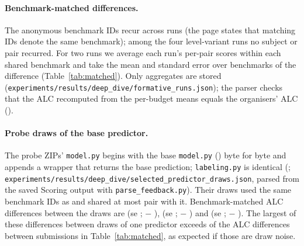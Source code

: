 \documentclass{article}
\begin{document}
\paragraph{Benchmark-matched differences.} The anonymous benchmark IDs recur across runs (the page states that matching IDs denote the same benchmark); among the four level-variant runs no subject or pair recurred. For two runs we average each run's per-pair scores within each shared benchmark and take the mean and standard error over benchmarks of the difference (Table~\ref{tab:matched}). Only aggregates are stored (\texttt{experiments/results/deep\_dive/formative\_runs.json}); the parser checks that the ALC recomputed from the per-budget means equals the organisers' ALC (\FmSelAlcConsistent).

\begin{table}[htbp]
\caption{Benchmark-matched differences between formative runs: mean (standard error) over the \FmMatchSelShipN{} shared benchmarks. Negative favours the first run. In the ALC column no entry reaches two standard errors (largest $|t|=\FmMatchMaxAbsT$). Of all \FmMatchNEntries{} entries, \FmMatchNAboveTwo{} reaches two standard errors (largest $|t|=\FmMatchMaxAbsTAll$), and \FmMatchNAboveCrit{} reach the two-sided 5\% critical value of $t$ with \FmMatchDf{} degrees of freedom (\FmMatchTCrit), before any correction for the \FmMatchNEntries{} comparisons.}
\label{tab:matched}
\centering\footnotesize\setlength{\tabcolsep}{3pt}
\end{table}

\paragraph{Probe draws of the base predictor.} The probe ZIPs' \texttt{model.py} begins with the base \texttt{model.py} (\SelId) byte for byte and appends a wrapper that returns the base prediction; \texttt{labeling.py} is identical (\SdSameCode; \texttt{experiments/results/deep\_dive/selected\_predictor\_draws.json}, parsed from the saved Scoring output with \texttt{parse\_feedback.py}). Their draws used the same \SdSharedBenchMin{} benchmark IDs as \SelId{} and shared at most \SdSharedPairsMax{} pair with it. Benchmark-matched ALC differences between the draws are \SdMatchTwoOneMean{} (se \SdMatchTwoOneSe; \SdDrawTwoId{} $-$ \SdDrawOneId), \SdMatchThreeOneMean{} (se \SdMatchThreeOneSe; \SdDrawThreeId{} $-$ \SdDrawOneId) and \SdMatchThreeTwoMean{} (se \SdMatchThreeTwoSe; \SdDrawThreeId{} $-$ \SdDrawTwoId). The largest of these differences between draws of one predictor exceeds \SdMatchNBetweenBelow{} of the \SdMatchNBetween{} ALC differences between submissions in Table~\ref{tab:matched}, as expected if those are draw noise.
\end{document}
